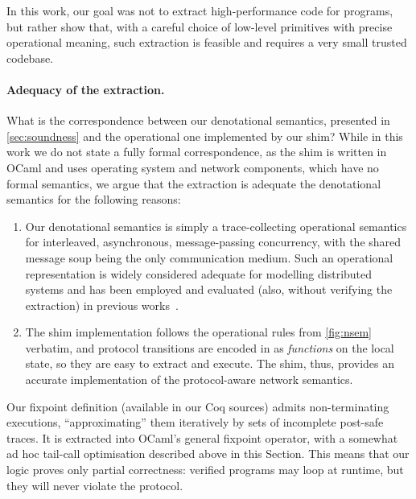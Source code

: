 In this work, our goal was not to extract high-performance code for
\disel programs, but rather show that, with a careful choice of
low-level primitives with precise operational meaning, such extraction
is feasible and requires a very small trusted codebase.
%

\paragraph{Adequacy of the extraction.~}

What is the correspondence between our denotational semantics,
presented in \cref{sec:soundness} and the operational one
implemented by our shim?
%
%
While in this work we do not state a fully formal correspondence, as
the shim is written in OCaml and uses operating system and network
components, which have no formal semantics, we argue that the
extraction is adequate \wrt the denotational semantics for the
following reasons:

\begin{enumerate}

\item Our denotational semantics is simply a trace-collecting
  operational semantics for interleaved, asynchronous, message-passing
  concurrency, with the shared message soup being the only
  communication medium. Such an operational representation is widely
  considered adequate for modelling distributed systems and has been
  employed and evaluated (also, without verifying the extraction) in
  previous works~\cite{
    Wilcox-al:PLDI15,Hawblitzel-al:SOSP15,Padon-al:PLDI16}.

\item The shim implementation follows the operational rules from
  \cref{fig:nsem} verbatim, and protocol transitions are encoded
  in \disel as \emph{functions} on the local state, so they are easy
  to extract and execute. The shim, thus, provides an accurate
  implementation of the protocol-aware network semantics.

\end{enumerate}

\noindent
%
Our fixpoint definition (available in our Coq sources) admits
non-terminating executions, ``approximating'' them iteratively by sets
of incomplete post-safe traces. It is extracted into OCaml's general
fixpoint operator, with a somewhat ad hoc tail-call optimisation
described above in this Section. This means that our logic proves only
partial correctness: verified programs may loop at runtime, but they
will never violate the protocol.

